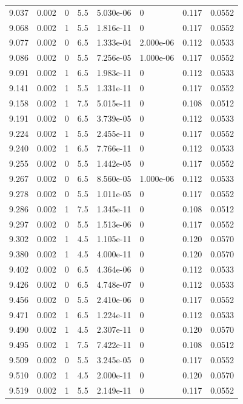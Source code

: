 \documentclass[preview]{standalone}
\begin{document}
{{{{{{{{{{\begin{tabular}{L{1.2cm}C{1.2cm} C{0.3cm}C{0.5cm} C{1.4cm}C{1.4cm} C{1.4cm}C{1.4cm}}
  9.037  &  0.002  & 0     & 5.5 &  5.030e-06  & 0  & 0.117 &  0.0552   \\ 
  9.068  &  0.002  & 1     & 5.5 &  1.816e-11  & 0  & 0.117 &  0.0552   \\ 
  9.077  &  0.002  & 0     & 6.5 &  1.333e-04  & 2.000e-06  & 0.112 &  0.0533   \\ 
  9.086  &  0.002  & 0     & 5.5 &  7.256e-05  & 1.000e-06  & 0.117 &  0.0552   \\ 
  9.091  &  0.002  & 1     & 6.5 &  1.983e-11  & 0  & 0.112 &  0.0533   \\ 
  9.141  &  0.002  & 1     & 5.5 &  1.331e-11  & 0  & 0.117 &  0.0552   \\ 
  9.158  &  0.002  & 1     & 7.5 &  5.015e-11  & 0  & 0.108 &  0.0512   \\ 
  9.191  &  0.002  & 0     & 6.5 &  3.739e-05  & 0  & 0.112 &  0.0533   \\ 
  9.224  &  0.002  & 1     & 5.5 &  2.455e-11  & 0  & 0.117 &  0.0552   \\ 
  9.240  &  0.002  & 1     & 6.5 &  7.766e-11  & 0  & 0.112 &  0.0533   \\ 
  9.255  &  0.002  & 0     & 5.5 &  1.442e-05  & 0  & 0.117 &  0.0552   \\ 
  9.267  &  0.002  & 0     & 6.5 &  8.560e-05  & 1.000e-06  & 0.112 &  0.0533   \\ 
  9.278  &  0.002  & 0     & 5.5 &  1.011e-05  & 0  & 0.117 &  0.0552   \\ 
  9.286  &  0.002  & 1     & 7.5 &  1.345e-11  & 0  & 0.108 &  0.0512   \\ 
  9.297  &  0.002  & 0     & 5.5 &  1.513e-06  & 0  & 0.117 &  0.0552   \\ 
  9.302  &  0.002  & 1     & 4.5 &  1.105e-11  & 0  & 0.120 &  0.0570   \\ 
  9.380  &  0.002  & 1     & 4.5 &  4.000e-11  & 0  & 0.120 &  0.0570   \\ 
  9.402  &  0.002  & 0     & 6.5 &  4.364e-06  & 0  & 0.112 &  0.0533   \\ 
  9.426  &  0.002  & 0     & 6.5 &  4.748e-07  & 0  & 0.112 &  0.0533   \\ 
  9.456  &  0.002  & 0     & 5.5 &  2.410e-06  & 0  & 0.117 &  0.0552   \\ 
  9.471  &  0.002  & 1     & 6.5 &  1.224e-11  & 0  & 0.112 &  0.0533   \\ 
  9.490  &  0.002  & 1     & 4.5 &  2.307e-11  & 0  & 0.120 &  0.0570   \\ 
  9.495  &  0.002  & 1     & 7.5 &  7.422e-11  & 0  & 0.108 &  0.0512   \\ 
  9.509  &  0.002  & 0     & 5.5 &  3.245e-05  & 0  & 0.117 &  0.0552   \\ 
  9.510  &  0.002  & 1     & 4.5 &  2.000e-11  & 0  & 0.120 &  0.0570   \\ 
  9.519  &  0.002  & 1     & 5.5 &  2.149e-11  & 0  & 0.117 &  0.0552   \\ 
\hline 
\end{tabular} 

}}}}}}}}}}
\end{document}
